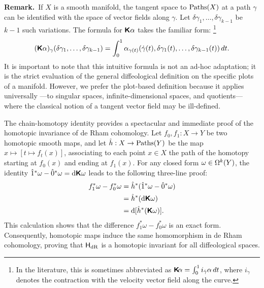\begin{article}
    \textbf{Remark.}~If $X$ is a smooth manifold,
    the tangent space to $\operatorname{Paths}(X)$ at a path $\gamma$ can be identified with the space of vector fields along $\gamma$.
    Let $\delta\gamma_1, \dots, \delta\gamma_{k-1}$ be $k-1$ such variations.
    The formula for $\boldsymbol{\mathsf{K}}\alpha$ takes the familiar form:%
    \footnote{In the literature, this is sometimes abbreviated as $\boldsymbol{\mathsf{K}}\!\alpha = \int_0^1 i_{\dot{\gamma}} \alpha \, dt$, where $i_{\dot{\gamma}}$ denotes the contraction with the velocity vector field along the curve.}
    \[
      (\boldsymbol{\mathsf{K}}\alpha)_\gamma(\delta\gamma_1, \dots, \delta\gamma_{k-1}) = \int_0^1 \alpha_{\gamma(t)}(\dot{\gamma}(t), \delta\gamma_1(t), \dots, \delta\gamma_{k-1}(t)) \, dt.
      \]
    It is important to note that this intuitive formula is not an ad-hoc adaptation;
    it is the strict evaluation of the general diffeological definition on the specific plots of a manifold.
    However,
    we prefer the plot-based definition because it applies universally
    ---to singular spaces,
    infinite-dimensional spaces,
    and quotients---
    where the classical notion of a tangent vector field may be ill-defined.
  \end{article}
  
  \begin{article}
    The chain-homotopy identity provides a spectacular and immediate proof of the homotopic invariance of de Rham cohomology.
    Let $f_0, f_1: X \to Y$ be two homotopic smooth maps,
    and let $\hat{h}: X \to \operatorname{Paths}(Y)$ be the map $x \mapsto [t \mapsto f_t(x)]$,
    associating to each point $x \in X$ the path of the homotopy starting at $f_0(x)$ and ending at $f_1(x)$.
    For any closed form $\omega \in \Omega^k(Y)$,
    the identity $\hat 1^*\omega - \hat 0^*\omega = \mathrm{d}\boldsymbol{\mathsf{K}}\omega$ leads to the following three-line proof:
    \begin{align*}
      f_1^*\omega - f_0^*\omega &= \hat{h}^*(\hat 1^*\omega - \hat 0^*\omega) \\
      &= \hat{h}^*(\mathrm{d}\boldsymbol{\mathsf{K}}\omega) \\
      &= \mathrm{d}[\hat{h}^*(\boldsymbol{\mathsf{K}}\omega)].
    \end{align*}
    This calculation shows that the difference $f_1^*\omega - f_0^*\omega$ is an exact form.
    Consequently,
    homotopic maps induce the same homomorphism in de Rham cohomology,
    proving that $\mathsf{H}_\mathrm{dR}$ is a homotopic invariant for all diffeological spaces.
  \end{article}
  
